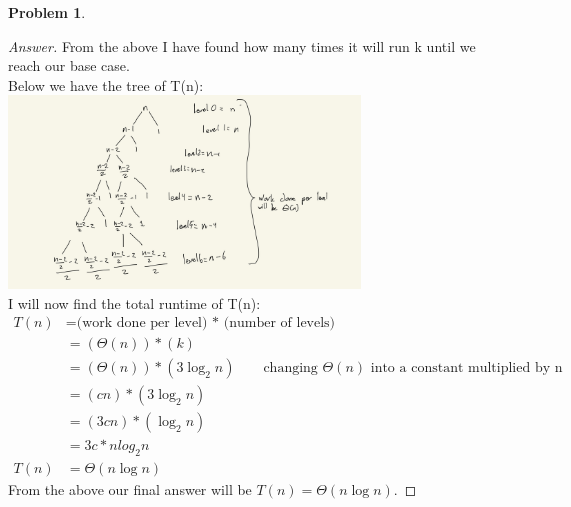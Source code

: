 \documentclass[11pt]{article}
\theoremstyle{definition}
\theoremstyle{definition}
\newtheorem{required}{Problem}
\theoremstyle{definition}
\begin{document}
\begin{required}
\begin{enumerate}[label=(\alph*)]
\begin{proof}[Answer]
From the above I have found how many times it will run k until we reach our base case. \\
Below we have the tree of T(n): \\
\includegraphics[width=0.7\textwidth]{IMG_0E6F840A444F-1.jpeg}\\

I will now find the total runtime of T(n): \\
\begin{align*}
T(n) &= \textrm{(work done per level) * (number of levels)} \\
&= (\Theta(n)) * (k) \\
&= (\Theta(n)) * (3\log_2 n) \qquad \textrm{changing $\Theta(n)$ into a constant multiplied by n} \\
&= (cn) * (3\log_2 n) \\
&= (3cn) * (\log_2 n) \\
&= 3c*nlog_2 n\\
T(n) &= \Theta(n\log n)
\end{align*}
From the above our final answer will be $T(n) = \Theta(n\log n)$.


\end{proof}

\end{enumerate}
\end{required}



\end{document}
